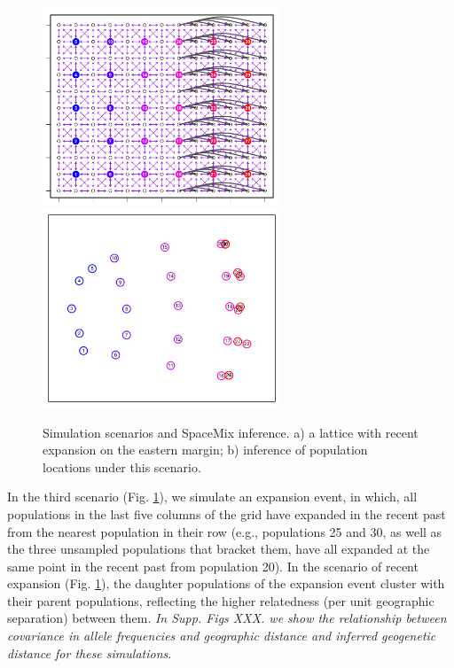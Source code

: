 \documentclass[12pt]{article}
\newcommand{\gc}[1]{{\em \color{blue} #1}}
\begin{document}
\begin{figure}
	\centering
			{\includegraphics[width=2.8in,height=2.33in]{figs/sims/expansion_lattice.png}}
			{\includegraphics[width=2.8in,height=2.33in]{figs/sims/GeoGenMap_expansion.pdf}}
	\caption{Simulation scenarios and SpaceMix inference.  a) a lattice with recent expansion on the eastern margin; b) inference of population locations under this scenario.}\label{sfig:expansion_scenarios}
\end{figure}

In the third scenario (Fig. \ref{sfig:expansion_scenarios}), we simulate an expansion event, in which, all populations in the last five columns of the grid have expanded in the recent past from the nearest population in their row (e.g., populations 25 and 30, as well as the three unsampled populations that bracket them, have all expanded at the same point in the recent past from population 20). In the scenario of recent expansion (Fig. \ref{sfig:expansion_scenarios}), the daughter populations of the expansion event cluster with their parent populations, reflecting the higher relatedness (per unit geographic separation) between them.  \gc{In Supp. Figs XXX. we show the relationship between covariance in allele frequencies and geographic distance and inferred geogenetic distance for these simulations}.
\end{document}

